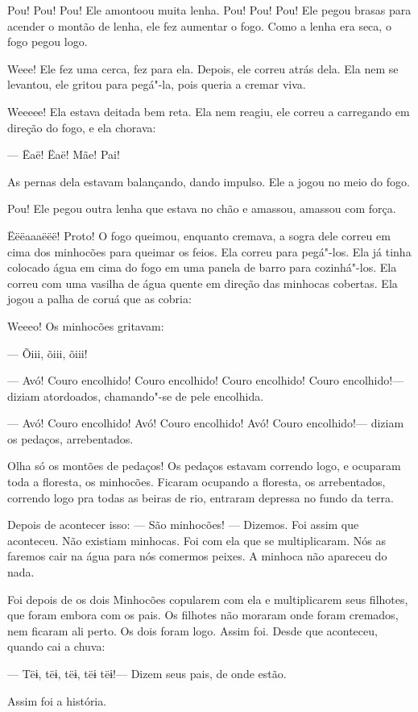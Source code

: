 Pou! Pou! Pou! Ele amontoou muita lenha. Pou! Pou! Pou! Ele pegou
brasas para acender o montão de lenha, ele fez aumentar o fogo. Como a
lenha era seca, o fogo pegou logo. 

Weee! Ele fez uma cerca, fez para ela. Depois, ele correu atrás dela.
Ela nem se levantou, ele gritou para pegá"-la, pois queria a cremar viva. 

Weeeee! Ela estava deitada bem reta. Ela nem reagiu, ele correu a carregando
em direção do fogo, e ela chorava: 

--- Ëaë! Ëaë! Mãe! Pai! 

As pernas dela estavam balançando, dando impulso. Ele a jogou no meio
do fogo. 

Pou! Ele pegou outra lenha que estava no chão e amassou, amassou com
força. 

Ëëëaaaëëë! Proto! O fogo queimou, enquanto cremava, a sogra dele correu
em cima dos minhocões para queimar os feios. Ela correu para pegá"-los.
Ela já tinha colocado água em cima do fogo em uma panela de barro para
cozinhá"-los. Ela correu com uma vasilha de água quente em direção das
minhocas cobertas. Ela jogou a palha de coruá que as cobria: 

Weeeo! Os minhocões gritavam:

--- Õiii, õiii, õiii! 

--- Avó! Couro encolhido! Couro encolhido! Couro encolhido! Couro
encolhido!--- diziam atordoados, chamando"-se de pele encolhida. 

--- Avó! Couro encolhido! Avó! Couro encolhido! Avó! Couro encolhido!---
diziam os pedaços, arrebentados. 

Olha só os montões de pedaços! Os pedaços estavam correndo logo, e
ocuparam toda a floresta, os minhocões. Ficaram ocupando a floresta, os
arrebentados, correndo logo pra todas as beiras de rio, entraram depressa
no fundo da terra. 

Depois de acontecer isso: --- São minhocões! --- Dizemos. Foi assim que aconteceu.
Não existiam minhocas. Foi com ela que se multiplicaram. Nós as faremos
cair na água para nós comermos peixes. A minhoca não apareceu do nada. 

Foi depois de os dois Minhocões copularem com ela e multiplicarem seus
filhotes, que foram embora com os pais. Os filhotes não moraram onde
foram cremados, nem ficaram ali perto. Os dois foram logo. Assim foi. Desde
que aconteceu, quando cai a chuva:

--- Tëɨ, tëɨ, tëɨ, tëɨ tëɨ!--- Dizem seus pais, de onde estão. 

Assim foi a história.